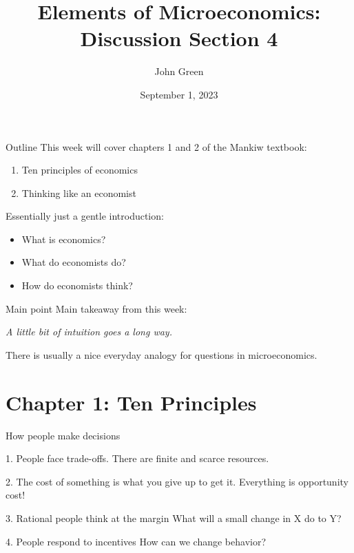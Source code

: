 \documentclass[aspectratio=169]{beamer}
\title{Elements of Microeconomics: \\
       Discussion Section 4}
\author{John Green}
\date{September 1, 2023}
\begin{document}
\begin{frame}
    \titlepage 
\end{frame}

\begin{frame}{Outline}
    This week will cover chapters 1 and 2 of the Mankiw textbook:
    \begin{enumerate}
        \item Ten principles of economics
        \item Thinking like an economist
    \end{enumerate}

    \medskip

    Essentially just a gentle introduction: 
    \begin{itemize}
        \item What is economics?
        \item What do economists do?
        \item How do economists think?
    \end{itemize}
\end{frame}

\begin{frame}{Main point}
    \centering
    Main takeaway from this week:

    \vspace{12pt}

    \Large \textit{A little bit of intuition goes a long way.}

    \bigskip

    \normalsize There is usually a nice everyday analogy for questions in microeconomics. 
\end{frame}

\section{Chapter 1: Ten Principles}

\begin{frame}{How people make decisions}
    \begin{block}{1. People face trade-offs.}
        There are finite and scarce resources.
    \end{block}

    \begin{block}{2. The cost of something is what you give up to get it.}
        Everything is opportunity cost!
    \end{block}

    \begin{block}{3. Rational people think at the margin}
        What will a small change in X do to Y?
    \end{block}

    \begin{block}{4. People respond to incentives}
        How can we change behavior?
    \end{block}
\end{frame} 
\end{document}
